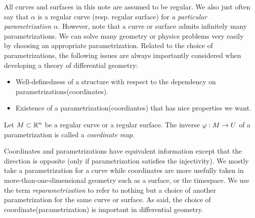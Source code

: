 \documentclass{../exp}
\def\a{\alpha}
\begin{document}
All curves and surfaces in this note are assumed to be regular.
We also just often say that $\a$ is a regular curve (resp. regular surface) for \emph{a particular parametrization $\a$}.
However, note that a curve or surface admits infinitely many parametrizations.
We can solve many geometry or physics problems very easily by choosing an appropriate parametrization.
Related to the choice of parametrizations, the following issues are always importantly considered when developing a theory of differential geometry:
\begin{itemize}
\item Well-definedness of a structure with respect to the dependency on parametrizations(coordinates).
\item Existence of a parametrization(coordiantes) that has nice properties we want.
\end{itemize}

\begin{defn}
Let $M\subset\mathbb{R}^n$ be a regular curve or a regular surface.
The inverse $\f:M\to U$ of a parametrization is called a \emph{coordinate map}.
\end{defn}

Coordinates and parametrizations have equivalent information except that the direction is opposite (only if parametrization satisfies the injectivity).
We mostly take a parametrization for a curve while coordinates are more usefully taken in more-than-one-dimensional geometry such as a surface, or the timespace.
We use the term \emph{reparametrization} to refer to nothing but a choice of another parametrization for the same curve or surface.
As said, the choice of coordinate(parametrization) is important in differential geometry.
\end{document}
